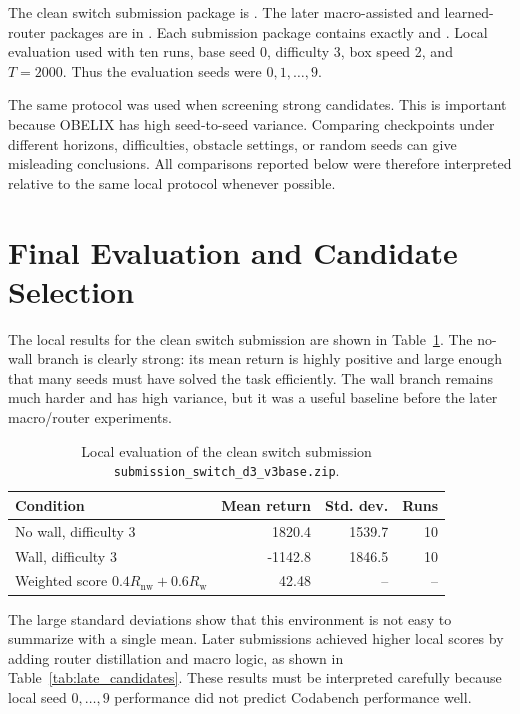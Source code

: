 \documentclass[11pt]{article}
\begin{document}
The clean switch submission package is
. The later
macro-assisted and learned-router packages are in . Each
submission package contains exactly  and . Local
evaluation used  with ten runs, base seed 0, difficulty 3, box speed
2, and \(T=2000\). Thus the evaluation seeds were \(0,1,\ldots,9\).

The same protocol was used when screening strong candidates. This is important because
OBELIX has high seed-to-seed variance. Comparing checkpoints under different horizons,
difficulties, obstacle settings, or random seeds can give misleading conclusions. All
comparisons reported below were therefore interpreted relative to the same local
protocol whenever possible.

\section{Final Evaluation and Candidate Selection}

The local results for the clean switch submission are shown in
Table~\ref{tab:final_eval}. The no-wall branch is clearly strong: its mean return is
highly positive and large enough that many seeds must have solved the task efficiently.
The wall branch remains much harder and has high variance, but it was a useful baseline
before the later macro/router experiments.

\begin{table}[htbp]
\centering
\begin{tabular}{lrrr}
\toprule
Condition & Mean return & Std. dev. & Runs \\
\midrule
No wall, difficulty 3 & 1820.4 & 1539.7 & 10 \\
Wall, difficulty 3 & -1142.8 & 1846.5 & 10 \\
\midrule
Weighted score \(0.4R_{\text{nw}}+0.6R_{\text{w}}\) & 42.48 & -- & -- \\
\bottomrule
\end{tabular}
\caption{Local evaluation of the clean switch submission
\texttt{submission\_switch\_d3\_v3base.zip}.}
\label{tab:final_eval}
\end{table}

The large standard deviations show that this environment is not easy to summarize with a
single mean. Later submissions achieved higher local scores by adding router
distillation and macro logic, as shown in Table~\ref{tab:late_candidates}. These results
must be interpreted carefully because local seed \(0,\ldots,9\) performance did not
predict Codabench performance well.
\end{document}
